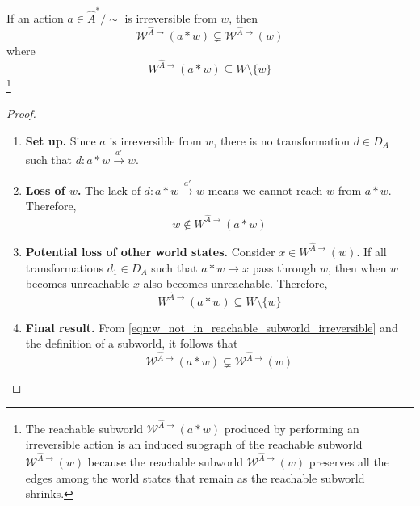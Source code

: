 \begin{proposition}
\label{prp:reachable_subworld_irreversible_action}
    If an action $a \in \hat{A}^{*}/\sim$ is irreversible from $w$, then
    \begin{equation}
        \mathscr{W}^{\hat{A}\to}(a \ast w) \subsetneq \mathscr{W}^{\hat{A}\to}(w)
    \end{equation}
    where
    \begin{equation}
        W^{\hat{A}\to}(a \ast w) \subseteq W \setminus \{w\}
    \end{equation}
    \footnote{
    The reachable subworld $\mathscr{W}^{\hat{A}\to}(a \ast w)$ produced by performing an irreversible action is an induced subgraph of the reachable subworld $\mathscr{W}^{\hat{A}\to}(w)$ because the reachable subworld $\mathscr{W}^{\hat{A}\to}(w)$ preserves all the edges among the world states that remain as the reachable subworld shrinks.
    }
\end{proposition}
\begin{proof}
\begin{enumerate}[(1)]
    \item \textbf{Set up.}
    Since $a$ is irreversible from $w$, there is no transformation $d \in D_{A}$ such that $d: a \ast w \xrightarrow{a'} w$.

    \item \textbf{Loss of $w$.}
    The lack of $d: a \ast w \xrightarrow{a'} w$ means we cannot reach $w$ from $a \ast w$.
    Therefore,
    \begin{equation}
        w \not\in W^{\hat{A}\to}(a \ast w)
        \label{eqn:w_not_in_reachable_subworld_irreversible}
    \end{equation}

    \item \textbf{Potential loss of other world states.}
    Consider $x \in W^{\hat{A}\to}(w)$.
    If all transformations $d_{1} \in D_{A}$ such that $a \ast w \to x$ pass through $w$, then when $w$ becomes unreachable $x$ also becomes unreachable.
    Therefore,
    \begin{equation}
        W^{\hat{A}\to}(a \ast w) \subseteq W \setminus \{w\}
    \end{equation}

    \item \textbf{Final result.}
    From \cref{eqn:w_not_in_reachable_subworld_irreversible} and the definition of a subworld, it follows that
    \begin{equation}
        \mathscr{W}^{\hat{A}\to}(a \ast w) \subsetneq \mathscr{W}^{\hat{A}\to}(w)
    \end{equation}
\end{enumerate}
\end{proof}



